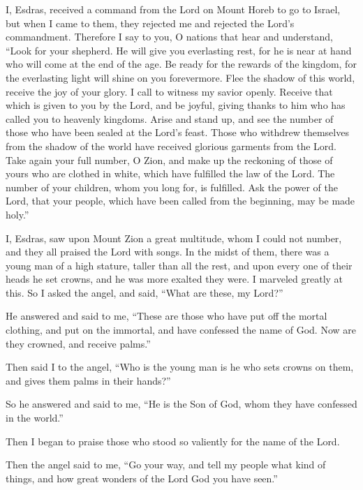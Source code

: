  I, Esdras, received a command from the Lord on Mount Horeb
to go to Israel, but when I came to them, they rejected me and rejected
the Lord's commandment.  Therefore I say to you, O nations
that hear and understand, ``Look for your shepherd. He will give you
everlasting rest, for he is near at hand who will come at the end of the
age.  Be ready for the rewards of the kingdom, for the
everlasting light will shine on you forevermore.  Flee the
shadow of this world, receive the joy of your glory. I call to witness
my savior openly.  Receive that which is given to you by
the Lord, and be joyful, giving thanks to him who has called you to
heavenly kingdoms.  Arise and stand up, and see the number
of those who have been sealed at the Lord's feast.  Those
who withdrew themselves from the shadow of the world have received
glorious garments from the Lord.  Take again your full
number, O Zion, and make up the reckoning of those of yours who are
clothed in white, which have fulfilled the law of the Lord.
 The number of your children, whom you long for, is
fulfilled. Ask the power of the Lord, that your people, which have been
called from the beginning, may be made holy.''

 I, Esdras, saw upon Mount Zion a great multitude, whom I
could not number, and they all praised the Lord with songs.
 In the midst of them, there was a young man of a high
stature, taller than all the rest, and upon every one of their heads he
set crowns, and he was more exalted they were. I marveled greatly at
this.  So I asked the angel, and said, ``What are these, my
Lord?''

 He answered and said to me, ``These are those who have put
off the mortal clothing, and put on the immortal, and have confessed the
name of God. Now are they crowned, and receive palms.''

 Then said I to the angel, ``Who is the young man is he who
sets crowns on them, and gives them palms in their hands?''

 So he answered and said to me, ``He is the Son of God,
whom they have confessed in the world.''

Then I began to praise those who stood so valiently for the name of the
Lord.

 Then the angel said to me, ``Go your way, and tell my
people what kind of things, and how great wonders of the Lord God you
have seen.''

